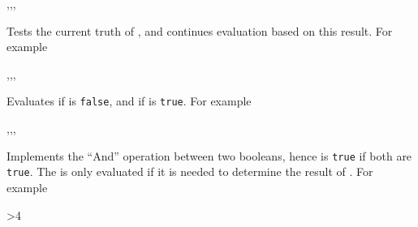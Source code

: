 \documentclass[oneside]{book}
\begin{document}
\begin{function}{\BoolVarIf,\BoolVarIfT,\BoolVarIfF,\BoolVarIfTF}
\begin{syntax}
 
  
  
   
\end{syntax}
Tests the current truth of , and continues evaluation
based on this result. For example
\begin{demohigh}
\BoolSetTrue \lTmpaBool
\BoolVarIfTF {} {}
\BoolSetFalse \lTmpaBool
\BoolVarIfTF {} {}
\end{demohigh}
\end{function}

\begin{function}{\BoolVarNot,\BoolVarNotT,\BoolVarNotF,\BoolVarNotTF}
\begin{syntax}
 
  
  
   
\end{syntax}
Evaluates  if  is \verb!false!,
and  if  is \verb!true!.
For example
\begin{demohigh}
 {} {}
\end{demohigh}
\end{function}

\begin{function}{\BoolVarAnd,\BoolVarAndT,\BoolVarAndF,\BoolVarAndTF}
\begin{syntax}
  
   
   
    
\end{syntax}
Implements the \enquote{And} operation between two booleans,
hence is \texttt{true} if both are \texttt{true}.
The  is only evaluated if it is needed to determine the result of
.
For example
\begin{demohigh}
 {>{4}} {} {}
\end{demohigh}
\end{function}
\end{document}
